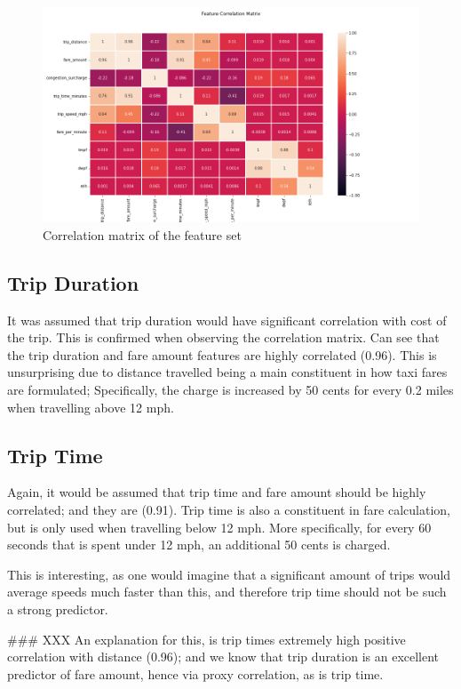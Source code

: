 \documentclass[11pt]{article}
\begin{document}
\begin{figure}[H]
    \includegraphics[width=1\textwidth]{corr_matrix.png}
    \centering
    \caption{Correlation matrix of the feature set}
    \label{fig:corrmatix}
\end{figure}


\subsection{Trip Duration}
It was assumed that trip duration would have significant correlation with cost of the trip. 
This is confirmed when observing the correlation matrix. Can see that the trip duration and fare amount features are highly correlated (0.96).
This is unsurprising due to distance travelled being a main constituent in how taxi fares are formulated; Specifically, the charge is increased by 50 cents for every 0.2 miles when travelling above 12 mph\cite{nycfarepage}.

\subsection{Trip Time}
Again, it would be assumed that trip time and fare amount should be highly correlated; and they are (0.91). Trip time is also a constituent in fare calculation, but is only used when travelling below 12 mph. More specifically, for every 60 seconds that is spent under 12 mph, an additional 50 cents is charged\cite{nycfarepage}.

This is interesting, as one would imagine that a significant amount of trips would average speeds much faster than this, and therefore trip time should not be such a strong predictor.

\#\#\# XXX
An explanation for this, is trip times extremely high positive correlation with distance (0.96); and we know that trip duration is an excellent predictor of fare amount, hence via proxy correlation, as is trip time.
\end{document}
